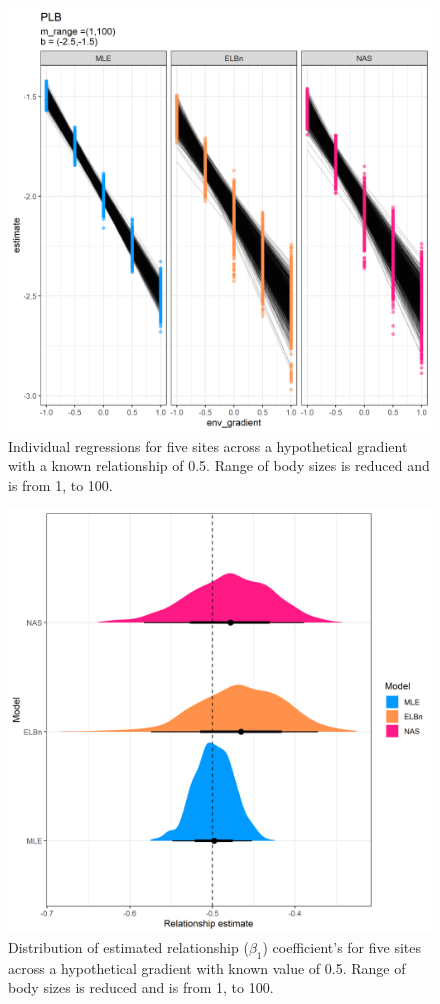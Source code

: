 \documentclass[
]{article}
\begin{document}
\begin{figure}
\centering
\includegraphics{figures/PLB_small_m_main.png}
\caption{Individual regressions for five sites across a hypothetical
gradient with a known relationship of 0.5. Range of body sizes is
reduced and is from 1, to 100.}
\end{figure}

\newpage

\begin{figure}
\centering
\includegraphics{figures/PLB_small_m_relationship_density.png}
\caption{Distribution of estimated relationship (\(\beta_1\))
coefficient's for five sites across a hypothetical gradient with known
value of 0.5. Range of body sizes is reduced and is from 1, to 100.}
\end{figure}
\end{document}
